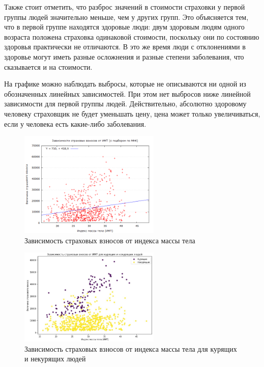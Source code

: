\documentclass[a4paper,12pt]{article}
\begin{document}
Также стоит отметить, что разброс значений в стоимости страховки у первой группы людей значительно меньше, чем у других групп. Это объясняется тем, что в первой группе находятся здоровые люди: двум здоровым людям одного возраста положена страховка одинаковой стоимости, поскольку они по состоянию здоровья практически не отличаются. В это же время люди с отклонениями в здоровье могут иметь разные осложнения и разные степени заболевания, что сказывается и на стоимости.

На графике можно наблюдать выбросы, которые не описываются ни одной из обозначенных линейных зависимостей. При этом нет выбросов ниже линейной зависимости для первой группы людей. Действительно, абсолютно здоровому человеку страховщик не будет уменьшать цену, цена может только увеличиваться, если у человека есть какие-либо заболевания. 

\begin{figure}[H]
	\includegraphics[width=0.6\textwidth]{../[graphics]/сharges-bmi.png}
	\centering
	\caption{Зависимость страховых взносов от индекса массы тела}
	\label{fig:charges-bmi}
\end{figure}

\begin{figure}[H]
	\includegraphics[width=0.6\textwidth]{../[graphics]/charges-bmi-smoker.jpg}
	\centering
	\caption{Зависимость страховых взносов от индекса массы тела для курящих и некурящих людей}
	\label{fig:charges-bmi-smoker}
\end{figure}
\end{document}
